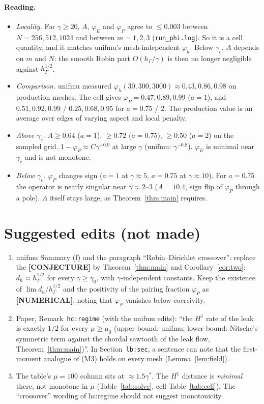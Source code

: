 \documentclass[11pt]{article}
\theoremstyle{remark}
\newcommand{\hG}{h_\Gamma}
\newcommand{\lab}[1]{\textbf{[#1]}}
\begin{document}
\paragraph{Reading.}
\begin{itemize}
\item \emph{Locality.} For $\gamma\ge20$, $A$, $\varphi_E$ and $\varphi_P$ agree to $\le0.003$ between $N=256,512,1024$ and between $m=1,2,3$ (\texttt{run\_phi.log}). So it is a cell quantity, and it matches unifmu's mesh-independent $\varphi_h$. Below $\gamma_c$, $A$ depends on $m$ and $N$: the smooth Robin part $O(\hG/\gamma)$ is then no longer negligible against $\hG^{1/2}$.
\item \emph{Comparison.} unifmu measured $\varphi_h(30,300,3000)\approx0.43,0.86,0.98$ on production meshes. The cell gives $\varphi_P=0.47,0.89,0.99$ ($a=1$), and $0.51,0.92,0.99$ / $0.25,0.68,0.95$ for $a=0.75$ / $2$. The production value is an average over edges of varying aspect and local penalty.
\item \emph{Above $\gamma_c$.} $A\ge0.64$ ($a=1$), $\ge0.72$ ($a=0.75$), $\ge0.50$ ($a=2$) on the sampled grid. $1-\varphi_P\approx C\gamma^{-0.9}$ at large $\gamma$ (unifmu: $\gamma^{-0.8}$). $\varphi_E$ is minimal near $\gamma_c$ and is not monotone.
\item \emph{Below $\gamma_c$.} $\varphi_P$ changes sign ($a=1$ at $\gamma\approx5$, $a=0.75$ at $\gamma\approx10$). For $a=0.75$ the operator is nearly singular near $\gamma\approx2$--$3$ ($A=10.4$, sign flip of $\varphi_P$ through a pole). $A$ itself stays large, as Theorem~\ref{thm:main} requires.
\end{itemize}

\section{Suggested edits (not made)}
\begin{enumerate}
\item unifmu Summary (f) and the paragraph ``Robin--Dirichlet crossover'': replace the \lab{CONJECTURE} by Theorem~\ref{thm:main} and Corollary~\ref{cor:two}: $d_h\asymp\hG^{1/2}$ for every $\gamma\ge\gamma_0$, with $\gamma$-independent constants. Keep the existence of $\lim d_h/\hG^{1/2}$ and the positivity of the pairing fraction $\varphi_P$ as \lab{NUMERICAL}, noting that $\varphi_P$ vanishes below coercivity.
\item Paper, Remark~\texttt{hc:regime} (with the unifmu edits): ``the $H^1$ rate of the leak is exactly $1/2$ for every $\mu\ge\mu_0$ (upper bound: unifmu; lower bound: Nitsche's symmetric term against the chordal sawtooth of the leak flow, Theorem~\ref{thm:main})''. In Section~\texttt{lb:sec}, a sentence can note that the first-moment analogue of (M3) holds on every mesh (Lemma~\ref{lem:field}).
\item The table's $\mu=100$ column sits at $\approx1.5\gamma^\ast$. The $H^1$ distance is \emph{minimal} there, not monotone in $\mu$ (Table~\ref{tab:solve}, cell Table~\ref{tab:cell}). The ``crossover'' wording of hc:regime should not suggest monotonicity.
\end{enumerate}
\end{document}

